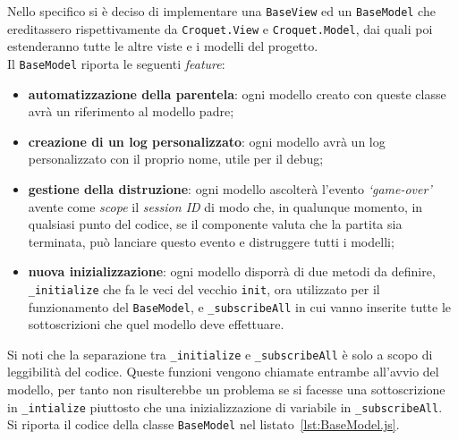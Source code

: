 Nello specifico si è deciso di implementare una \texttt{BaseView} ed un \texttt{BaseModel} che ereditassero rispettivamente da \texttt{Croquet.View} e \texttt{Croquet.Model}, dai 
quali poi estenderanno tutte le altre viste e i modelli del progetto.\\
Il \texttt{BaseModel} riporta le seguenti \textit{feature}:
\begin{itemize}
    \item \textbf{automatizzazione della parentela}: ogni modello creato con queste classe avrà un riferimento al modello padre;
    \item \textbf{creazione di un log personalizzato}: ogni modello avrà un log personalizzato con il proprio nome, utile per il debug;
    \item \textbf{gestione della distruzione}: ogni modello ascolterà l'evento \textit{`game-over'} avente come \textit{scope} il \textit{session ID} di modo che, in qualunque momento, in qualsiasi
    punto del codice, se il componente valuta che la partita sia terminata, può lanciare questo evento e distruggere tutti i modelli;
    \item \textbf{nuova inizializzazione}: ogni modello disporrà di due metodi da definire, \texttt{\_initialize} che fa le veci del vecchio \texttt{init}, ora utilizzato per il funzionamento
    del \texttt{BaseModel}, e \texttt{\_subscribeAll} in cui vanno inserite tutte le sottoscrizioni che quel modello deve effettuare.
\end{itemize}
Si noti che la separazione tra \texttt{\_initialize} e \texttt{\_subscribeAll} è solo a scopo di leggibilità del codice. Queste funzioni vengono chiamate entrambe all'avvio del modello, per
tanto non risulterebbe un problema se si facesse una sottoscrizione in \texttt{\_intialize} piuttosto che una inizializzazione di variabile in \texttt{\_subscribeAll}.\\
Si riporta il codice della classe \texttt{BaseModel} nel listato~\ref{lst:BaseModel.js}.

